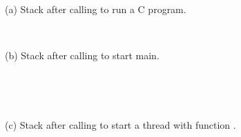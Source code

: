 \begin{table}\centering
\begin{multicols}{3}
\vspace*{\fill}
\begin{drawstacknoends}
\startframe
{}
 
\end{drawstacknoends}
(a) Stack after calling  to run a C program.

\

\columnbreak

\vspace*{\fill}

\begin{drawstacknotop}
\startframe
{}
\startframe
{}
\end{drawstacknotop}
(b) Stack after calling  to start main. 

\ 

\columnbreak

\vspace*{\fill}
\begin{drawstacknoends}
\startframe
{}
\end{drawstacknoends}

\

(c) Stack after calling  to start a thread with function . 

\end{multicols}
\caption{Prestacks: stacks created before the entry function executes. (a) Stack after calling , directly from a systemcall.  and the stackframe fro  (highlighted in red) are the only parts of this stack modeled by CompCert's semantics. (b) Stack shape when calling main indirectly through . (c) Stack right before a function  is executed in a new thread.}\label{table:premain_stacks}
\end{table}

